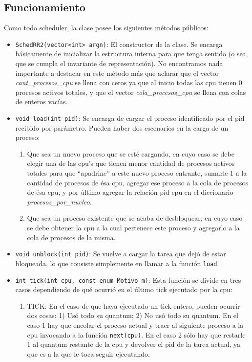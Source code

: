 \subsection{Funcionamiento} Como todo scheduler, la clase posee los siguientes m\'etodos p\'ublicos:
\begin{itemize}
	\item \texttt{SchedRR2(vector<int> argn)}: El constructor de la clase. Se encarga b\'asicamente de inicializar la estructura interna para que tenga sentido (o sea, que se cumpla el invariante de representaci\'on). No encontramos nada importante a destacar en este m\'etodo m\'as que aclarar que el vector \emph{cant\_procesos\_cpu} se llena con ceros ya que al inicio todas las cpu tienen 0 procesos activos totales, y que el vector \emph{cola\_procesos\_cpu} se llena con colas de enteros vac\'ias.
	\item \texttt{void load(int pid)}: Se encarga de cargar el proceso identificado por el pid recibido por par\'ametro. Pueden haber dos escenarios en la carga de un proceso:
	\begin{enumerate}
		\item Que sea un nuevo proceso que se est\'e cargando, en cuyo caso se debe elegir una de las cpu's que tienen menor cantidad de procesos activos totales para que ``apadrine'' a este nuevo proceso entrante, sumarle 1 a la cantidad de procesos de \'esa cpu, agregar ese proceso a la cola de procesos de \'esa cpu, y por \'ultimo agregar la relaci\'on pid-cpu en el diccionario \emph{procesos\_por\_nucleo}.
		\item Que sea un proceso existente que se acaba de desbloquear, en cuyo caso se debe obtener la cpu a la cual pertenece este proceso y agregarlo a la cola de procesos de la misma.
	\end{enumerate}
	\item \texttt{void unblock(int pid)}: Se vuelve a cargar la tarea que dej\'o de estar bloqueada, lo que consiste simplemente en llamar a la funci\'on \texttt{load}.
	\item \texttt{int tick(int cpu, const enum Motivo m)}: Esta funci\'on se divide en tres casos dependiendo de qu\'e ocurri\'o en el \'ultimo tick ejecutado por la cpu:
	\begin{enumerate}
		\item TICK: En el caso de que haya ejecutado un tick entero, pueden ocurrir dos cosas: 1) Us\'o todo su quantum; 2) No us\'o todo su quantum. En el caso 1 hay que encolar el proceso actual y traer al siguiente proceso a la cpu invocando a la funci\'on \texttt{next(cpu)}. En el caso 2 s\'olo hay que restarle 1 al quantum restante de la cpu y devolver el pid de la tarea actual, ya que es a la que le toca seguir ejecutando.

\end{enumerate}
\end{itemize}
